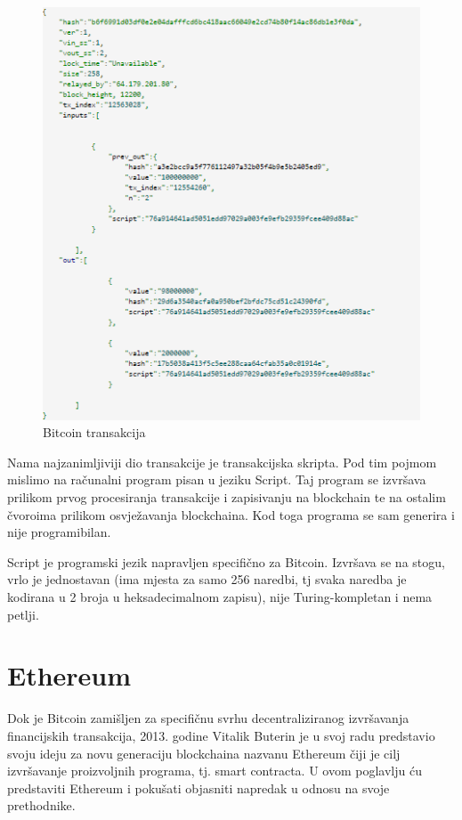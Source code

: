 \documentclass[12pt]{report}
\begin{document}
\begin{figure}[h]
\centering
\includegraphics[scale=0.9]{transakcija}
\caption{Bitcoin transakcija}
\label{fig:transakcija}
\end{figure}

Nama najzanimljiviji dio transakcije je transakcijska skripta. Pod tim pojmom mislimo na računalni program pisan u jeziku Script. Taj program se izvršava prilikom prvog procesiranja transakcije i zapisivanju na blockchain te na ostalim čvoroima prilikom osvježavanja blockchaina. Kod toga programa se sam generira i nije programibilan. 

Script\cite{script} je programski jezik napravljen specifično za Bitcoin. Izvršava se na stogu, vrlo je jednostavan (ima mjesta za samo 256 naredbi, tj svaka naredba je kodirana u 2 broja u heksadecimalnom zapisu), nije Turing-kompletan i nema petlji.

\chapter{Ethereum}

Dok je Bitcoin zamišljen za specifičnu svrhu decentraliziranog izvršavanja financijskih transakcija, 2013. godine Vitalik Buterin je u svoj radu\cite{eth_paper} predstavio svoju ideju za novu generaciju blockchaina nazvanu Ethereum čiji je cilj izvršavanje proizvoljnih programa, tj. smart contracta. U ovom poglavlju ću predstaviti Ethereum i pokušati objasniti napredak u odnosu na svoje prethodnike.
\end{document}
